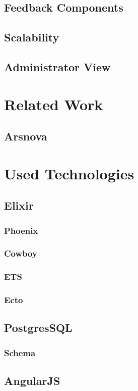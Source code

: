 \section{Feedback Components}

\section{Scalability}

\section{Administrator View}

\chapter{Related Work}
\section{Arsnova}

\chapter{Used Technologies}
\section{Elixir}
\subsection{Phoenix}
\subsection{Cowboy}
\subsection{ETS}
\subsection{Ecto}
\section{PostgresSQL}
\subsection{Schema}
\section{AngularJS}
